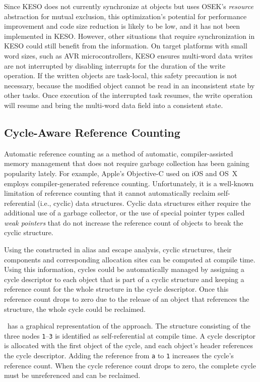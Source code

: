 			Since KESO does not currently synchronize at objects but uses OSEK's \emph{resource} abstraction for mutual
			exclusion, this optimization's potential for performance improvement and code size reduction is likely to be low,
			and it has not been implemented in KESO\@. However, other situations that require synchronization in KESO could
			still benefit from the information. On target platforms with small word sizes, such as AVR microcontrollers, KESO
			ensures multi-word data writes are not interrupted by disabling interrupts for the duration of the write
			operation. If the written objects are task-local, this safety precaution is not necessary, because the modified
			object cannot be read in an inconsistent state by other tasks. Once execution of the interrupted task resumes, the
			write operation will resume and bring the multi-word data field into a consistent state.

		\subsection{Cycle-Aware Reference Counting}
			\label{sub:ea:apps:cyclerefcnt}
			Automatic reference counting as a method of automatic, compiler-assisted memory management that does not require
			garbage collection has been gaining popularity lately. For example, Apple's Objective-C used on iOS and OS~X
			employs compiler-generated reference counting. Unfortunately, it is a well-known limitation of reference counting
			that it cannot automatically reclaim self-referential (i.e., cyclic) data structures. Cyclic data structures
			either require the additional use of a garbage collector, or the use of special pointer types called \emph{weak
			pointers} that do not increase the reference count of objects to break the cyclic structure.

			Using the  constructed in alias and escape analysis, cyclic structures, their components and
			corresponding allocation sites can be computed at compile time. Using this information, cycles could be
			automatically managed by assigning a cycle descriptor to each object that is part of a cyclic structure and
			keeping a reference count for the whole structure in the cycle descriptor. Once this reference count drops to zero
			due to the release of an object that references the structure, the whole cycle could be reclaimed.

			~has a graphical representation of the approach. The structure consisting of the
			three nodes \texttt{1}--\texttt{3} is identified as self-referential at compile time. A cycle descriptor is
			allocated with the first object of the cycle, and each object's header references the cycle descriptor. Adding the
			reference from \texttt{a} to \texttt{1} increases the cycle's reference count. When the cycle reference count
			drops to zero, the complete cycle must be unreferenced and can be reclaimed.

